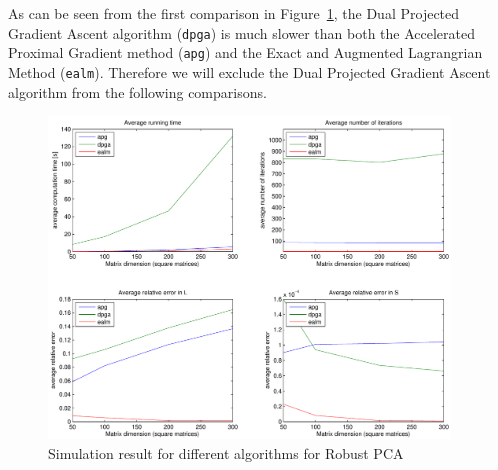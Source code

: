 As can be seen from the first comparison in Figure~\ref{Algorithms:Discussion:NumComp:ALG_incDual:figure}, the Dual Projected Gradient Ascent algorithm (\texttt{dpga}) is much slower than both the Accelerated Proximal Gradient method (\texttt{apg}) and the Exact and Augmented Lagrangrian Method (\texttt{ealm}). Therefore we will exclude the Dual Projected Gradient Ascent algorithm from the following comparisons. 
%
\begin{figure}[h]
\centering
\includegraphics[width=0.95\textwidth]{../figures/ALG_comparison_incDual}
\caption{Simulation result for different algorithms for Robust PCA}
\label{Algorithms:Discussion:NumComp:ALG_incDual:figure}
\end{figure}

